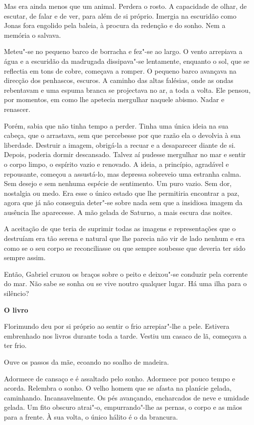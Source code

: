 Mas era ainda menos que um animal. Perdera o rosto. A capacidade de
olhar, de escutar, de falar e de ver, para além de si próprio. Imergia
na escuridão como Jonas fora engolido pela baleia, à procura da redenção
e do sonho. Nem a memória o salvava.

Meteu"-se no pequeno barco de borracha e fez"-se ao largo. O vento
arrepiava a água e a escuridão da madrugada dissipava"-se lentamente,
enquanto o sol, que se reflectia em tons de cobre, começava a romper. O
pequeno barco avançava na direcção dos penhascos, escuros. A caminho das
altas falésias, onde as ondas rebentavam e uma espuma branca se
projectava no ar, a toda a volta. Ele pensou, por momentos, em como lhe
apetecia mergulhar naquele abismo. Nadar e renascer.

Porém, sabia que não tinha tempo a perder. Tinha uma única ideia na sua
cabeça, que o arrastava, sem que percebesse por que razão ela o devolvia
à sua liberdade. Destruir a imagem, obrigá-la a recuar e a desaparecer
diante de si. Depois, poderia dormir descansado. Talvez aí pudesse
mergulhar no mar e sentir o corpo limpo, o espírito vazio e renovado. A
ideia, a princípio, agradável e repousante, começou a assustá-lo, mas
depressa sobreveio uma estranha calma. Sem desejo e sem nenhuma espécie
de sentimento. Um puro vazio. Sem dor, nostalgia ou medo. Era esse o
único estado que lhe permitiria encontrar a paz, agora que já não
conseguia deter"-se sobre nada sem que a insidiosa imagem da ausência lhe
aparecesse. A mão gelada de Saturno, a mais escura das noites.

A aceitação de que teria de suprimir todas as imagens e representações
que o destruíam era tão serena e natural que lhe parecia não vir de lado
nenhum e era como se o seu corpo se reconciliasse ou que sempre soubesse
que deveria ter sido sempre assim.

Então, Gabriel cruzou os braços sobre o peito e deixou"-se conduzir pela
corrente do mar. Não sabe se sonha ou se vive noutro qualquer lugar. Há
uma ilha para o silêncio?

\vspace*{1.8cm}
\noindent{}\textbf{O livro}

Florimundo deu por si próprio ao sentir o frio arrepiar"-lhe a pele.
Estivera embrenhado nos livros durante toda a tarde. Vestiu um casaco de
lã, começava a ter frio.

Ouve os passos da mãe, ecoando no soalho de madeira.

Adormece de cansaço e é assaltado pelo sonho. Adormece por pouco tempo e
acorda. Relembra o sonho. O velho homem que se afasta na planície
gelada, caminhando. Incansavelmente. Os pés avançando, encharcados de
neve e umidade gelada. Um fito obscuro atrai"-o, empurrando"-lhe as
pernas, o corpo e as mãos para a frente. À sua volta, o único hálito é o
da brancura.

